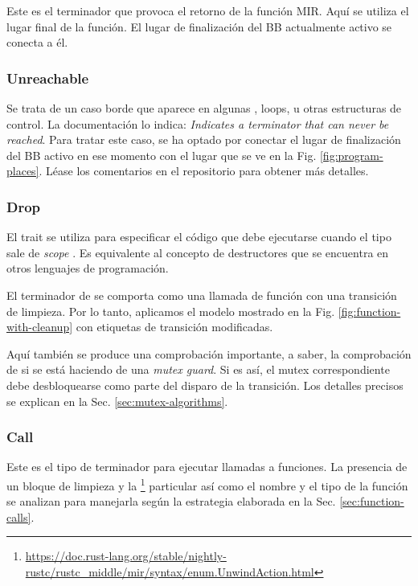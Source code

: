 Este es el terminador que provoca el retorno de la función \acrshort{MIR}.
Aquí se utiliza el lugar final de la función.
El lugar de finalización del \acrshort{BB} actualmente activo se conecta a él.

\subsubsection{Unreachable}

Se trata de un caso borde que aparece en algunas ,
 loops, u otras estructuras de control.
La documentación lo indica: \emph{Indicates a terminator that can never be reached}.
Para tratar este caso, se ha optado por conectar el lugar de finalización del \acrshort{BB} activo en ese
momento con el lugar  que se ve en la Fig. \ref{fig:program-places}.
Léase los comentarios en el repositorio para obtener más detalles.

\subsubsection{Drop}

El trait  se utiliza para especificar el código que debe ejecutarse cuando el
tipo sale de \textit{scope} \cite[Chap. 15.3]{rust-book}. Es equivalente al concepto de
destructores que se encuentra en otros lenguajes de programación.

El terminador de  se comporta como una llamada de función con una transición de
limpieza. Por lo tanto, aplicamos el modelo mostrado en la Fig. \ref{fig:function-with-cleanup}
con etiquetas de transición modificadas.

Aquí también se produce una comprobación importante, a saber, la comprobación de si se está
haciendo  de una \textit{mutex guard}.
Si es así, el mutex correspondiente debe desbloquearse como
parte del disparo de la transición. Los detalles precisos se explican en la Sec. \ref{sec:mutex-algorithms}.

\subsubsection{Call}

Este es el tipo de terminador para ejecutar llamadas a funciones. La presencia de un bloque de
limpieza y la \footnote{\url{https://doc.rust-lang.org/stable/nightly-rustc/rustc_middle/mir/syntax/enum.UnwindAction.html}}
particular así como el nombre y el tipo de la función se analizan
para manejarla según la estrategia elaborada en la Sec. \ref{sec:function-calls}.

